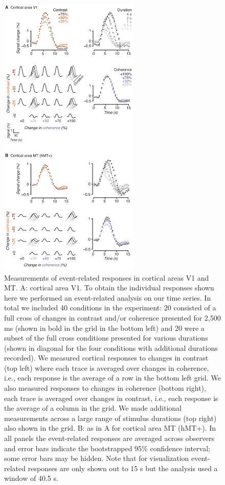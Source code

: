 \begin{figure}
\centering
\includegraphics[keepaspectratio,width=0.6\textwidth]{figs_c2/Fig2_v1mt.pdf}
\caption[Measurements of event-related responses in cortical areas V1 and MT]{Measurements of event-related responses in cortical areas V1 and MT. A: cortical area V1. To obtain the individual responses shown here we performed an event-related analysis on our time series. In total we included 40 conditions in the experiment: 20 consisted of a full cross of changes in contrast and/or coherence presented for 2,500 ms (shown in bold in the grid in the bottom left) and 20 were a subset of the full cross conditions presented for various durations (shown in diagonal for the four conditions with additional durations recorded). We measured cortical responses to changes in contrast (top left) where each trace is averaged over changes in coherence, i.e., each response is the average of a row in the bottom left grid. We also measured responses to changes in coherence (bottom right), each trace is averaged over changes in contrast, i.e., each response is the average of a column in the grid. We made additional measurements across a large range of stimulus durations (top right) also shown in the grid. B: as in A for cortical area MT (hMT+). In all panels the event-related responses are averaged across observers and error bars indicate the bootstrapped 95\% confidence interval; some error bars may be hidden. Note that for visualization event-related responses are only shown out to 15 s but the analysis used a window of 40.5 s.}
\label{fig:c2f2}
\end{figure}


